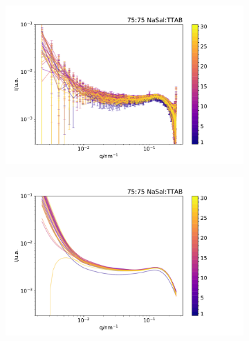 \begin{figure}[h]
    \begin{subfigure}[t]{0.5\textwidth}
        \centering
        \includegraphics[width=\textwidth]{imagens/saxs/TR_saxs_75_75_dados.pdf}
        \caption{}
        \label{fig:saxs_tr_}
    \end{subfigure}%
    \begin{subfigure}[t]{0.5\textwidth}
        \centering
        \includegraphics[width=\textwidth]{imagens/saxs/TR_saxs_75_75_ajuste.pdf}
        \caption{}
        \label{fig:saxs_tr_}
    \end{subfigure}
    \caption{}
    \label{fig:}
\end{figure} 
